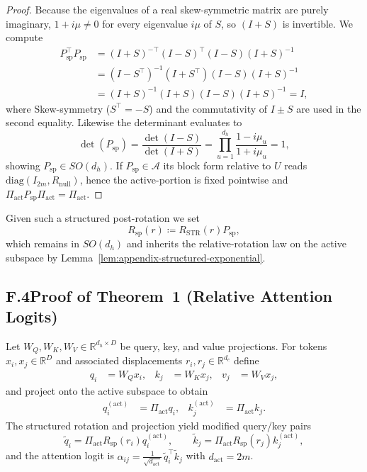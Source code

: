 \documentclass[11pt]{article}
\newcommand{\Real}{\mathbb{R}}
\begin{document}
\begin{proof}
Because the eigenvalues of a real skew-symmetric matrix are purely imaginary, $1+i\mu \ne 0$ for every
eigenvalue $i\mu$ of $S$, so $(I+S)$ is invertible.  We compute
\begin{align}
  P_{\mathrm{sp}}^\top P_{\mathrm{sp}}
    &= (I+S)^{-\top} (I-S)^\top (I-S) (I+S)^{-1}\\
    &= (I-S^\top)^{-1} (I+S^\top) (I-S) (I+S)^{-1}\\
    &= (I+S)^{-1} (I+S) (I-S) (I+S)^{-1} = I,
\end{align}
where Skew-symmetry ($S^\top=-S$) and the commutativity of $I\pm S$ are used in the second equality.
Likewise the determinant evaluates to
\begin{equation}
  \det(P_{\mathrm{sp}})
  = \frac{\det(I-S)}{\det(I+S)}
  = \prod_{u=1}^{d_h} \frac{1-i\mu_u}{1+i\mu_u} = 1,
\end{equation}
showing $P_{\mathrm{sp}}\in SO(d_h)$.  If $P_{\mathrm{sp}}\in\mathcal{A}$ its block form relative to $U$
reads $\mathrm{diag}(I_{2m}, R_{\mathrm{null}})$, hence the active-portion is fixed pointwise and
$\Pi_{\mathrm{act}} P_{\mathrm{sp}} \Pi_{\mathrm{act}} = \Pi_{\mathrm{act}}$.
\end{proof}

Given such a structured post-rotation we set
\begin{equation}
  R_{\mathrm{sp}}(r) \coloneqq R_{\mathrm{STR}}(r) P_{\mathrm{sp}},
  \label{eq:appendix-Rsp}
\end{equation}
which remains in $SO(d_h)$ and inherits the relative-rotation law on the active subspace by
Lemma~\ref{lem:appendix-structured-exponential}.

\subsection*{F.4\quad Proof of Theorem~1 (Relative Attention Logits)}

Let $W_Q,W_K,W_V \in \Real^{d_h\times D}$ be query, key, and value projections.  For tokens
$x_i,x_j\in\Real^{D}$ and associated displacements $r_i,r_j\in\Real^{d_c}$ define
\begin{align}
  q_i &= W_Q x_i,
  &
  k_j &= W_K x_j,
  &
  v_j &= W_V x_j,
\end{align}
and project onto the active subspace to obtain
\begin{align}
  q_i^{(\mathrm{act})} &= \Pi_{\mathrm{act}} q_i,
  &
  k_j^{(\mathrm{act})} &= \Pi_{\mathrm{act}} k_j.
\end{align}
The structured rotation and projection yield modified query/key pairs
\begin{equation}
  \tilde q_i = \Pi_{\mathrm{act}} R_{\mathrm{sp}}(r_i) q_i^{(\mathrm{act})},
  \qquad
  \tilde k_j = \Pi_{\mathrm{act}} R_{\mathrm{sp}}(r_j) k_j^{(\mathrm{act})},
  \label{eq:appendix-tilde-qk}
\end{equation}
and the attention logit is $\alpha_{ij} = \tfrac{1}{\sqrt{d_{\mathrm{act}}}}\,\tilde q_i^\top \tilde k_j$ with
$d_{\mathrm{act}} = 2m$.
\end{document}
